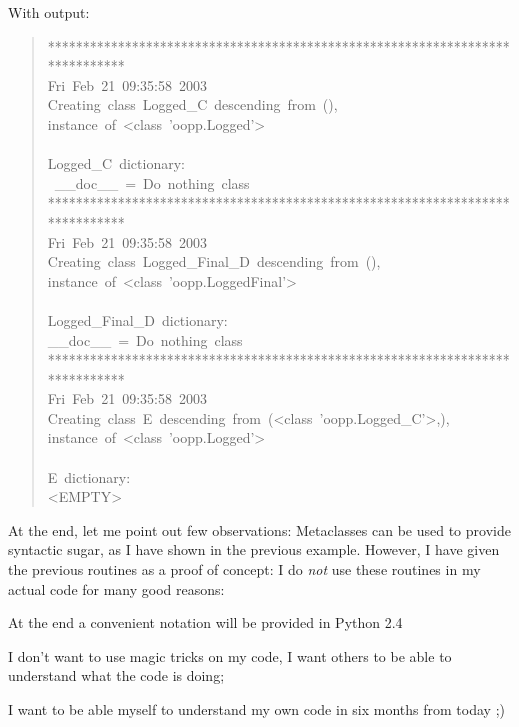 \documentclass[10pt,english]{article}
\begin{document}
With output:
\begin{quote}
\begin{ttfamily}\begin{flushleft}
\mbox{*****************************************************************************}\\
\mbox{Fri~Feb~21~09:35:58~2003}\\
\mbox{Creating~class~Logged{\_}C~descending~from~(),}\\
\mbox{instance~of~<class~'oopp.Logged'>}\\
\mbox{}\\
\mbox{Logged{\_}C~dictionary:}\\
\mbox{~{\_}{\_}doc{\_}{\_}~=~Do~nothing~class}\\
\mbox{*****************************************************************************}\\
\mbox{Fri~Feb~21~09:35:58~2003}\\
\mbox{Creating~class~Logged{\_}Final{\_}D~descending~from~(),}\\
\mbox{instance~of~<class~'oopp.LoggedFinal'>}\\
\mbox{}\\
\mbox{Logged{\_}Final{\_}D~dictionary:}\\
\mbox{{\_}{\_}doc{\_}{\_}~=~Do~nothing~class}\\
\mbox{*****************************************************************************}\\
\mbox{Fri~Feb~21~09:35:58~2003}\\
\mbox{Creating~class~E~descending~from~(<class~'oopp.Logged{\_}C'>,),}\\
\mbox{instance~of~<class~'oopp.Logged'>}\\
\mbox{}\\
\mbox{E~dictionary:}\\
\mbox{<EMPTY>~}
\end{flushleft}\end{ttfamily}
\end{quote}

At the end, let me point out few observations:
Metaclasses can be used to provide syntactic sugar, as I have shown
in the previous example. However, I have given the previous
routines as a proof of concept: I do \emph{not} use these routines in
my actual code for many good reasons:
\begin{list}{.}
{
\setlength{\rightmargin}{\leftmargin}
}
\item {} 
At the end a convenient notation will be provided in Python 2.4

\item {} 
I don't want to use magic tricks on my code, I want others to
be able to understand what the code is doing;

\item {} 
I want to be able myself to understand my own code in six months
from today ;)

\end{list}
\end{document}
